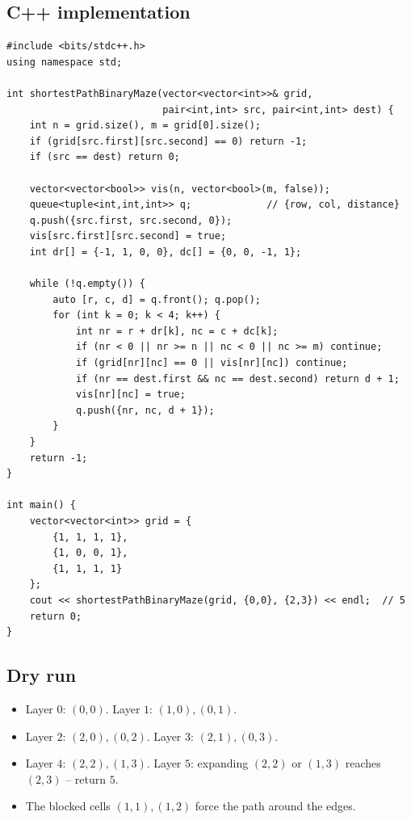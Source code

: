 \subsection*{C++ implementation}

\begin{lstlisting}
#include <bits/stdc++.h>
using namespace std;

int shortestPathBinaryMaze(vector<vector<int>>& grid,
                           pair<int,int> src, pair<int,int> dest) {
    int n = grid.size(), m = grid[0].size();
    if (grid[src.first][src.second] == 0) return -1;
    if (src == dest) return 0;

    vector<vector<bool>> vis(n, vector<bool>(m, false));
    queue<tuple<int,int,int>> q;             // {row, col, distance}
    q.push({src.first, src.second, 0});
    vis[src.first][src.second] = true;
    int dr[] = {-1, 1, 0, 0}, dc[] = {0, 0, -1, 1};

    while (!q.empty()) {
        auto [r, c, d] = q.front(); q.pop();
        for (int k = 0; k < 4; k++) {
            int nr = r + dr[k], nc = c + dc[k];
            if (nr < 0 || nr >= n || nc < 0 || nc >= m) continue;
            if (grid[nr][nc] == 0 || vis[nr][nc]) continue;
            if (nr == dest.first && nc == dest.second) return d + 1;
            vis[nr][nc] = true;
            q.push({nr, nc, d + 1});
        }
    }
    return -1;
}

int main() {
    vector<vector<int>> grid = {
        {1, 1, 1, 1},
        {1, 0, 0, 1},
        {1, 1, 1, 1}
    };
    cout << shortestPathBinaryMaze(grid, {0,0}, {2,3}) << endl;  // 5
    return 0;
}
\end{lstlisting}

\subsection*{Dry run}


\begin{itemize}
  \item Layer $0$: $(0,0)$. Layer $1$: $(1,0),(0,1)$.
  \item Layer $2$: $(2,0),(0,2)$. Layer $3$: $(2,1),(0,3)$.
  \item Layer $4$: $(2,2),(1,3)$. Layer $5$: expanding $(2,2)$ or
        $(1,3)$ reaches $(2,3)$ -- return $5$.
  \item The blocked cells $(1,1),(1,2)$ force the path around the
        edges.
\end{itemize}

